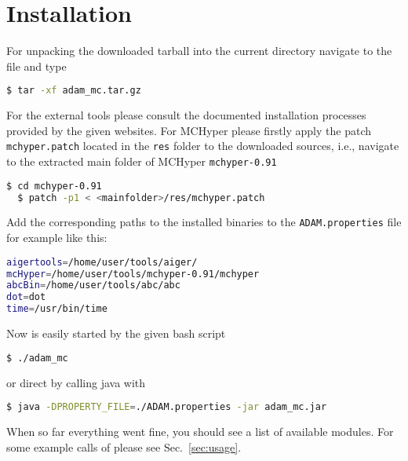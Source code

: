 \documentclass[12pt,twoside,a4paper,openright]{memoir}
\begin{document}
\section{Installation}
\label{sec:installation}
For unpacking the downloaded tarball into the current directory
navigate to the file and type
\begin{lstlisting}[language=bash]
  $ tar -xf adam_mc.tar.gz
\end{lstlisting}
For the external tools please consult the documented installation processes
provided by the given websites. For MCHyper please firstly apply the patch \texttt{mchyper.patch}
located in the \texttt{res} folder to the downloaded sources, i.e., navigate 
to the extracted main folder of MCHyper \texttt{mchyper-0.91}
\begin{lstlisting}[language=bash]
  $ cd mchyper-0.91
  $ patch -p1 < <mainfolder>/res/mchyper.patch 
\end{lstlisting}
Add the corresponding paths to the installed binaries to the \texttt{ADAM.properties} file
for example like this:
\begin{lstlisting}[language=bash]
aigertools=/home/user/tools/aiger/
mcHyper=/home/user/tools/mchyper-0.91/mchyper
abcBin=/home/user/tools/abc/abc
dot=dot
time=/usr/bin/time
\end{lstlisting}
Now \tool{} is easily started by the given bash script
\begin{lstlisting}[language=bash]
$ ./adam_mc
\end{lstlisting}
or direct by calling java with
\begin{lstlisting}[language=bash]
$ java -DPROPERTY_FILE=./ADAM.properties -jar adam_mc.jar
\end{lstlisting}
When so far everything went fine, you should see a list of available modules.
For some example calls of \tool{} please see Sec.~\ref{sec:usage}.

\end{document}
